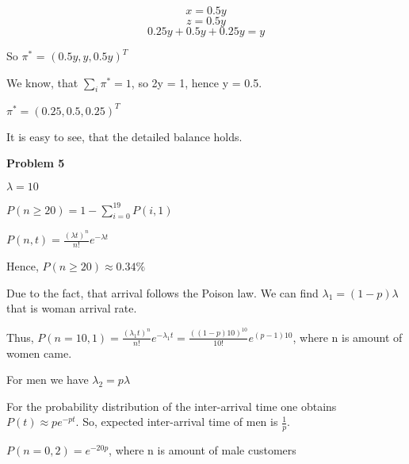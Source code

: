 \documentclass[12pt]{article}
\begin{document}
	$$x = 0.5 y$$
	$$z = 0.5 y$$
	$$0.25 y + 0.5y + 0.25 y = y$$
	
	So $\pi^*$ = $(0.5y, y, 0.5y)^T$
	
	We know, that $\sum_{i}\pi^* = 1$, so 2y = 1, hence y = 0.5.
	
	$\pi^*  = (0.25, 0.5, 0.25)^T$
	
	It is easy to see, that the detailed balance holds.
	
	\bigskip
	
	\textbf{Problem 5}
	
	\bigskip
	
	$\lambda = 10$
	
	$P(n \geq 20) = 1 - \sum_{i = 0}^{19}P(i, 1) $
	
	$P(n, t) = \frac{(\lambda t)^n}{n!} e^{-\lambda t} $
	
	Hence, $P(n \geq 20) \approx 0.34 \% $
	
	Due to the fact, that arrival follows the Poison law. We can find $\lambda_1 = (1 - p)\lambda$ that is woman arrival rate.
	
	Thus, 
	$P(n = 10, 1) = \frac{(\lambda_1 t)^n}{n!} e^{-\lambda_1 t} = \frac{((1 - p)10)^{10}}{10!} e^{(p - 1)10} $, where n is amount of women came.
	
	For men we have $\lambda_2 = p\lambda$
	
	For the probability distribution of the inter-arrival time one obtains
	$P(t) \approx p e^{-pt}$. So, expected inter-arrival time of men is $\frac{1}{p}$.
	
	$P(n = 0, 2) = e^{-20p}$, where n is amount of male customers
\end{document}

